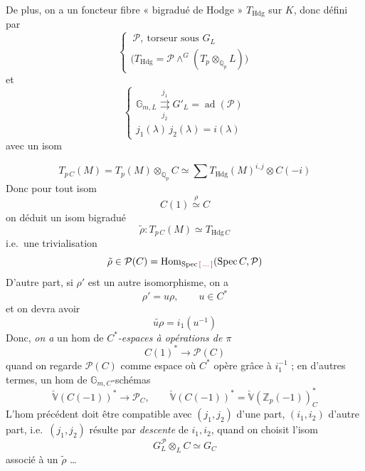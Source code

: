 \documentclass[11pt,a4paper]{article}
\begin{document}
De plus, on a un  foncteur fibre « bigradué de Hodge »
$T_{\mathrm{Hdg}}$ sur $K$, donc défini par
\[
\begin{cases}
\boxed{\ \mathcal{P},\ \text{torseur sous } G_L\ } \\
\bigl(T_{\mathrm{Hdg}} = \mathcal{P} \wedge^{G} (T_p \otimes_{\mathbb{Q}_p} L)\bigr)
\end{cases}
\]
et
\[
\begin{cases}
\mathbb{G}_{m,L} \overset{j_1}{\underset{j_2}{\rightrightarrows}} G'_L = \operatorname{ad}(\mathcal{P}) \\
j_1(\lambda)\, j_2(\lambda) = i(\lambda)
\end{cases}
\]
avec un isom 


\[
T_{p\,C}(M) = T_p(M) \otimes_{\mathbb{Q}_p} C \simeq \sum T_{\mathrm{Hdg}}(M)^{i,j} \otimes C(-i)
\]
Donc pour tout isom \struck{\ill{}}
\[
C(1) \overset{\rho}{\simeq} C
\]
on déduit un isom bigradué
\[
\tilde\rho : T_{p\,C}(M) \simeq T_{\mathrm{Hdg}\,C}
\]
i.e.\ une trivialisation
\[
\tilde\rho \in \mathcal{P}(C) = \operatorname{Hom}_{\operatorname{Spec} \ill{}}(\operatorname{Spec} C, \mathcal{P})
\]
D'autre part, si $\rho'$ est un autre isomorphisme, on a
\[
\rho' = u\rho, \qquad u \in C^*
\]
et on devra avoir
\[
\widetilde{u\rho} = i_1(u^{-1})
\]
Donc,  \emph{on a} un hom de 
\emph{$C^*$-espaces \emph{à opérations} de $\pi$}
\[
\boxed{\ C(1)^* \longrightarrow \mathcal{P}(C)\ }
\]
quand on regarde $\mathcal{P}(C)$ comme espace où $C^*$ opère grâce à
$i_1^{-1}$ ; en d'autres termes, un hom de $\mathbb{G}_{m,C}$-schémas
\[
\check{\mathbb{V}}(C(-1))^* \longrightarrow \mathcal{P}_C,
\qquad
\check{\mathbb{V}}(C(-1))^* = \check{\mathbb{V}}(\mathbb{Z}_p(-1))^*_C
\]
L'hom précédent doit être compatible avec $(j_1, j_2)$ d'une part,
$(i_1, i_2)$ d'autre part, i.e.\ $(j_1, j_2)$ résulte par \emph{descente}
de $i_1, i_2$, quand on choisit l'isom
\[
G_L^{\mathcal{P}} \otimes_L C \simeq G_C
\]
associé à un $\tilde\rho$ \ldots
\end{document}
